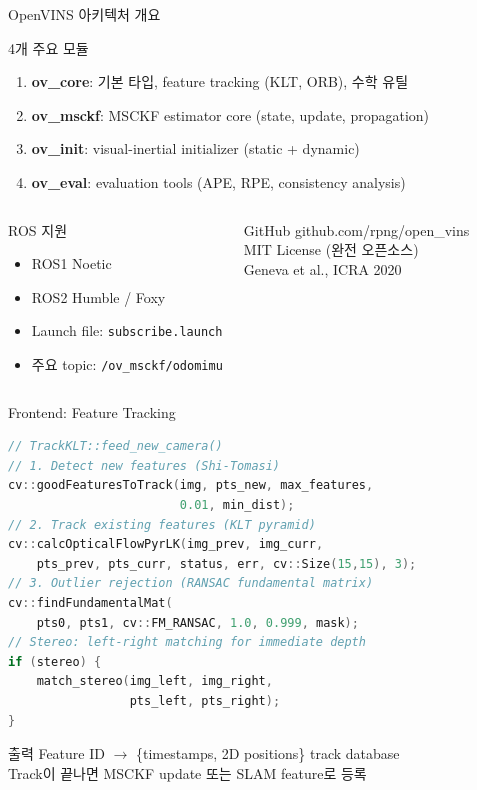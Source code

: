 \begin{frame}[shrink=10]{OpenVINS 아키텍처 개요}
  \begin{block}{4개 주요 모듈}
    \begin{enumerate}
      \item \textbf{ov\_core}: 기본 타입, feature tracking (KLT, ORB), 수학 유틸
      \item \textbf{ov\_msckf}: MSCKF estimator core (state, update, propagation)
      \item \textbf{ov\_init}: visual-inertial initializer (static + dynamic)
      \item \textbf{ov\_eval}: evaluation tools (APE, RPE, consistency analysis)
    \end{enumerate}
  \end{block}
  \begin{columns}[T]
      \begin{block}{ROS 지원}
        \begin{itemize}
          \item ROS1 Noetic
          \item ROS2 Humble / Foxy
          \item Launch file: \texttt{subscribe.launch}
          \item 주요 topic: \texttt{/ov\_msckf/odomimu}
        \end{itemize}
      \end{block}
      \begin{exampleblock}{GitHub}
        github.com/rpng/open\_vins\\
        MIT License (완전 오픈소스)\\
        Geneva et al., ICRA 2020
      \end{exampleblock}
  \end{columns}
\end{frame}


\begin{frame}[fragile,shrink=10]{Frontend: Feature Tracking}
\begin{lstlisting}[language=C++]
// TrackKLT::feed_new_camera()
// 1. Detect new features (Shi-Tomasi)
cv::goodFeaturesToTrack(img, pts_new, max_features,
                        0.01, min_dist);
// 2. Track existing features (KLT pyramid)
cv::calcOpticalFlowPyrLK(img_prev, img_curr,
    pts_prev, pts_curr, status, err, cv::Size(15,15), 3);
// 3. Outlier rejection (RANSAC fundamental matrix)
cv::findFundamentalMat(
    pts0, pts1, cv::FM_RANSAC, 1.0, 0.999, mask);
// Stereo: left-right matching for immediate depth
if (stereo) {
    match_stereo(img_left, img_right,
                 pts_left, pts_right);
}
\end{lstlisting}
  \begin{exampleblock}{출력}
    Feature ID $\to$ \{timestamps, 2D positions\} track database\\
    Track이 끝나면 MSCKF update 또는 SLAM feature로 등록
  \end{exampleblock}
\end{frame}


